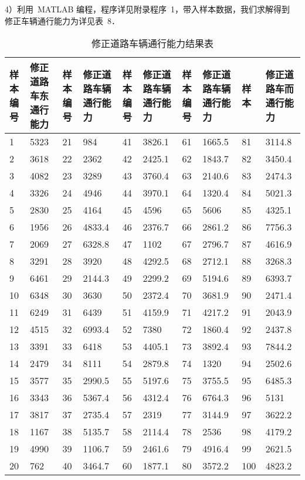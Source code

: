 4）利用~MATLAB 编程，程序详见附录程序~1，带入样本数据，我们求解得到
修正车辆通行能力为详见表~8．

\begin{table*}[h!]
  \centering
  \small
  \tabcolsep 2.5pt
  \caption{修正道路车辆通行能力结果表}
\begin{tabular*}{\linewidth}{p{20pt}<{\centering}p{60pt}<{\centering}p{20pt}<{\centering}
p{60pt}<{\centering}p{20pt}<{\centering}p{60pt}<{\centering}p{20pt}<{\centering}p{60pt}<{\centering}
p{20pt}<{\centering}p{60pt}<{\centering}}
\toprule
  样本 编号  &  修正道路车东通行能力  &  样本 编号  &  修正道路车辆通行能力  &  样本编号  &
   修正道路车辆通行能力  &  样本编号  &  修正道路车辆通行能力  &  样本  &  修正道路车而通行能力 \\
  \midrule
 1 & 5323 & 21 & 984 & 41 & 3826.1 & 61 & 1665.5 & 81 & 3114.8 \\
 2 & 3618 & 22 & 2362 & 42 & 2425.1 & 62 & 1843.7 & 82 & 3450.4 \\
 3 & 4082 & 23 & 3289 & 43 & 3760.4 & 63 & 2140.6 & 83 & 2474.3 \\
 4 & 3326 & 24 & 4946 & 44 & 3970.1 & 64 & 1320.4 & 84 & 5021.3 \\
 5 & 2830 & 25 & 4164 & 45 & 4596 & 65 & 5606 & 85 & 4325.1 \\
 6 & 1956 & 26 & 4833.4 & 46 & 2376.7 & 66 & 2861.2 & 86 & 7756.3 \\
 7 & 2069 & 27 & 6328.8 & 47 & 1102 & 67 & 2796.7 & 87 & 4616.9 \\
 8 & 3291 & 28 & 3920 & 48 & 4292.5 & 68 & 2712.1 & 88 & 3268.3 \\
 9 & 6461 & 29 & 2144.3 & 49 & 2299.2 & 69 & 5194.6 & 89 & 6393.7 \\
 10 & 6348 & 30 & 3630 & 50 & 2372.4 & 70 & 3681.9 & 90 & 2471.4 \\
 11 & 6249 & 31 & 6439 & 51 & 4159.9 & 71 & 4217.2 & 91 & 2043.9 \\
 12 & 4515 & 32 & 6993.4 & 52 & 7380 & 72 & 1860.4 & 92 & 2437.8 \\
 13 & 3391 & 33 & 6418 & 53 & 4405.1 & 73 & 3892.4 & 93 & 7844.2 \\
 14 & 2479 & 34 & 8111 & 54 & 2879.8 & 74 & 1320 & 94 & 2502.6 \\
 15 & 3577 & 35 & 2990.5 & 55 & 5197.6 & 75 & 3755.5 & 95 & 6485.3 \\
 16 & 3343 & 36 & 5367.4 & 56 & 4312.4 & 76 & 6764.3 & 96 & 5131 \\
 17 & 3817 & 37 & 2735.4 & 57 & 2319 & 77 & 3144.9 & 97 & 3622.2 \\
 18 & 1167 & 38 & 5135.7 & 58 & 2114.4 & 78 & 2536 & 98 & 4179.2 \\
 19 & 4990 & 39 & 1106.7 & 59 & 2461.6 & 79 & 4916.4 & 99 & 2621.5 \\
 20 & 762 & 40 & 3464.7 & 60 & 1877.1 & 80 & 3572.2 & 100 & 4823.2 \\
\bottomrule
  \end{tabular*}
  \label{tab8}
\end{table*}

